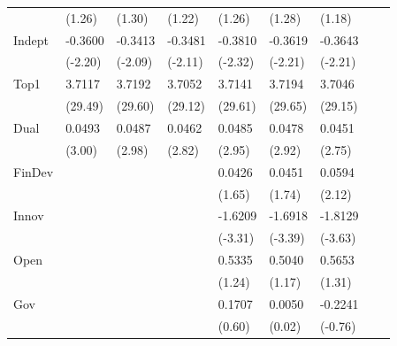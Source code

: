 \begin{table}[htbp]
\begin{tabularx}{\textwidth}{lYYYYYYYY@{}}
                &   (1.26)         &   (1.30)         &   (1.22)         &   (1.26)         &   (1.28)         &   (1.18)         \\
Indept          &  -0.3600\sym{**} &  -0.3413\sym{**} &  -0.3481\sym{**} &  -0.3810\sym{**} &  -0.3619\sym{**} &  -0.3643\sym{**} \\
                &  (-2.20)         &  (-2.09)         &  (-2.11)         &  (-2.32)         &  (-2.21)         &  (-2.21)         \\
Top1            &   3.7117\sym{***}&   3.7192\sym{***}&   3.7052\sym{***}&   3.7141\sym{***}&   3.7194\sym{***}&   3.7046\sym{***}\\
                &  (29.49)         &  (29.60)         &  (29.12)         &  (29.61)         &  (29.65)         &  (29.15)         \\
Dual            &   0.0493\sym{***}&   0.0487\sym{***}&   0.0462\sym{***}&   0.0485\sym{***}&   0.0478\sym{***}&   0.0451\sym{***}\\
                &   (3.00)         &   (2.98)         &   (2.82)         &   (2.95)         &   (2.92)         &   (2.75)         \\
FinDev          &                  &                  &                  &   0.0426\sym{*}  &   0.0451\sym{*}  &   0.0594\sym{**} \\
                &                  &                  &                  &   (1.65)         &   (1.74)         &   (2.12)         \\
Innov           &                  &                  &                  &  -1.6209\sym{***}&  -1.6918\sym{***}&  -1.8129\sym{***}\\
                &                  &                  &                  &  (-3.31)         &  (-3.39)         &  (-3.63)         \\
Open            &                  &                  &                  &   0.5335         &   0.5040         &   0.5653         \\
                &                  &                  &                  &   (1.24)         &   (1.17)         &   (1.31)         \\
Gov             &                  &                  &                  &   0.1707         &   0.0050         &  -0.2241         \\
                &                  &                  &                  &   (0.60)         &   (0.02)         &  (-0.76)         \\
\hline

\end{tabularx}
\end{table}
